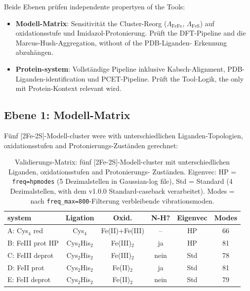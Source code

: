 \documentclass[11pt,a4paper,twoside]{article}
\theoremstyle{remark}
\begin{document}
Beide Ebenen pr\"ufen independente propertyen of the Tools:

\begin{itemize}
  \item \textbf{Modell-Matrix}: Sensitivit\"at the Cluster-Reorg
        ($\Lambda_\text{FeFe}$, $\Lambda_\text{FeS}$) auf oxidationsstufe und
        Imidazol-Protonierung. Pr\"uft the DFT-Pipeline and die
        Marcus-Hush-Aggregation, without of the PDB-Liganden-
        Erkennung abzuh\"angen.
  \item \textbf{Protein-system}: Vollst\"andige Pipeline inklusive
        Kabsch-Alignment, PDB-Liganden-identification und
        PCET-Pipeline. Pr\"uft the Tool-Logik, the only mit
        Protein-Kontext relevant wird.
\end{itemize}

\subsection{Ebene 1: Modell-Matrix}
\label{sec:val-modell-matrix}

F\"unf [2Fe-2S]-Modell-cluster were with unterschiedlichen
Liganden-Topologien, oxidationsstufen and Protonierungs-Zust\"anden
gerechnet:

\begin{table}[h]
\centering
\small
\begin{tabular}{|l|c|c|c|c|c|}
\hline
\textbf{system} & \textbf{Ligation} & \textbf{Oxid.} &
  \textbf{N-H?} & \textbf{Eigenvec} & \textbf{Modes} \\
\hline
A: Cys$_4$ red       & Cys$_4$    & Fe(II)+Fe(III) & --   & HP   & 66 \\
B: FeIII prot HP   & Cys$_2$His$_2$ & Fe(III)$_2$    & ja   & HP   & 81 \\
C: FeIII deprot      & Cys$_2$His$_2$ & Fe(III)$_2$    & nein & Std  & 78 \\
D: FeII prot         & Cys$_2$His$_2$ & Fe(II)$_2$     & ja   & Std  & 81 \\
E: FeII deprot       & Cys$_2$His$_2$ & Fe(II)$_2$     & nein & Std  & 79 \\
\hline
\end{tabular}
\caption{Validierungs-Matrix: f\"unf [2Fe-2S]-Modell-cluster mit
unterschiedlichen Liganden, oxidationsstufen and Protonierungs-
Zust\"anden. Eigenvec: HP = \texttt{freq=hpmodes} (5 Dezimalstellen
in Gaussian-log file), Std = Standard (4 Dezimalstellen, with dem
v1.0.0 Standard-caseback verarbeitet). Modes = nach
\texttt{freq\_max=800}-Filterung verbleibende vibrationsmoden.}
\label{tab:validierung-matrix}
\end{table}
\end{document}
